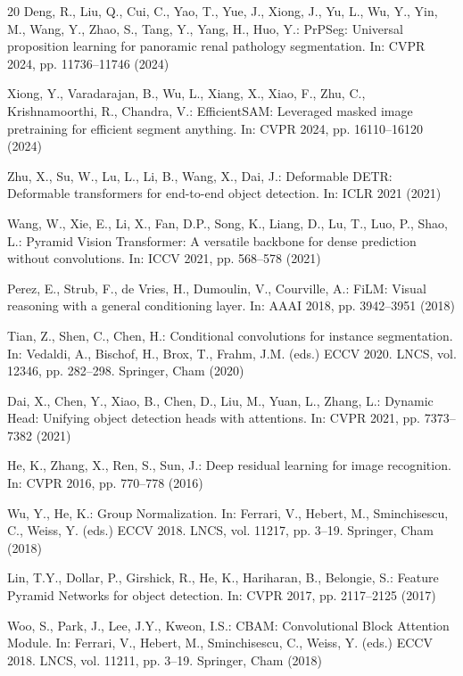 \documentclass[runningheads]{llncs}
\begin{document}
\begin{thebibliography}{20}
Deng, R., Liu, Q., Cui, C., Yao, T., Yue, J., Xiong, J., Yu, L., Wu, Y., Yin, M., Wang, Y., Zhao, S., Tang, Y., Yang, H., Huo, Y.: PrPSeg: Universal proposition learning for panoramic renal pathology segmentation. In: CVPR 2024, pp. 11736--11746 (2024)

Xiong, Y., Varadarajan, B., Wu, L., Xiang, X., Xiao, F., Zhu, C., Krishnamoorthi, R., Chandra, V.: EfficientSAM: Leveraged masked image pretraining for efficient segment anything. In: CVPR 2024, pp. 16110--16120 (2024)

Zhu, X., Su, W., Lu, L., Li, B., Wang, X., Dai, J.: Deformable DETR: Deformable transformers for end-to-end object detection. In: ICLR 2021 (2021)

Wang, W., Xie, E., Li, X., Fan, D.P., Song, K., Liang, D., Lu, T., Luo, P., Shao, L.: Pyramid Vision Transformer: A versatile backbone for dense prediction without convolutions. In: ICCV 2021, pp. 568--578 (2021)

Perez, E., Strub, F., de Vries, H., Dumoulin, V., Courville, A.: FiLM: Visual reasoning with a general conditioning layer. In: AAAI 2018, pp. 3942--3951 (2018)

Tian, Z., Shen, C., Chen, H.: Conditional convolutions for instance segmentation. In: Vedaldi, A., Bischof, H., Brox, T., Frahm, J.M. (eds.) ECCV 2020. LNCS, vol. 12346, pp. 282--298. Springer, Cham (2020)

Dai, X., Chen, Y., Xiao, B., Chen, D., Liu, M., Yuan, L., Zhang, L.: Dynamic Head: Unifying object detection heads with attentions. In: CVPR 2021, pp. 7373--7382 (2021)

He, K., Zhang, X., Ren, S., Sun, J.: Deep residual learning for image recognition. In: CVPR 2016, pp. 770--778 (2016)

Wu, Y., He, K.: Group Normalization. In: Ferrari, V., Hebert, M., Sminchisescu, C., Weiss, Y. (eds.) ECCV 2018. LNCS, vol. 11217, pp. 3--19. Springer, Cham (2018)

Lin, T.Y., Dollar, P., Girshick, R., He, K., Hariharan, B., Belongie, S.: Feature Pyramid Networks for object detection. In: CVPR 2017, pp. 2117--2125 (2017)

Woo, S., Park, J., Lee, J.Y., Kweon, I.S.: CBAM: Convolutional Block Attention Module. In: Ferrari, V., Hebert, M., Sminchisescu, C., Weiss, Y. (eds.) ECCV 2018. LNCS, vol. 11211, pp. 3--19. Springer, Cham (2018)


\end{thebibliography}
\end{document}
